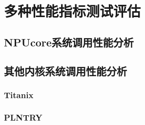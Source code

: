 \section{多种性能指标测试评估}

\subsection{NPUcore系统调用性能分析}



\subsection{其他内核系统调用性能分析}


\subsubsection{Titanix}


\subsubsection{PLNTRY}



